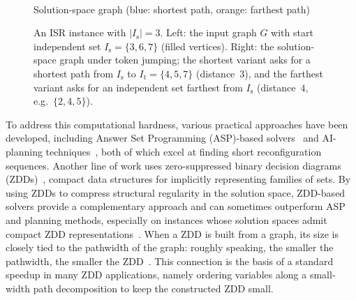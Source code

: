 \documentclass[conference]{IEEEtran}
\newcommand{\ini}{\mathrm{s}}
\newcommand{\tar}{\mathrm{t}}
\newcommand{\ISR}{\textsc{ISR}\xspace}
\begin{document}
\begin{figure}[t]
\begin{minipage}[t]{0.52\textwidth}
\\[-1mm]
{\small Solution-space graph (blue: shortest path, orange: farthest path)}
\end{minipage}
\caption{An \ISR instance with $|I_\ini|=3$.
Left: the input graph $G$ with start independent set
$I_\ini=\{3,6,7\}$ (filled vertices).
Right: the solution-space graph under token jumping; the shortest variant asks
for a shortest path from $I_\ini$ to $I_\tar=\{4,5,7\}$ (distance~$3$), and the
farthest variant asks for an independent set farthest from $I_\ini$ (distance~$4$,
e.g.\ $\{2,4,5\}$).}
\label{fig:core-example}
\end{figure}



To address this computational hardness, various practical approaches have been
developed, including Answer Set Programming (ASP)-based
solvers~\cite{ybisu24} and AI-planning techniques~\cite{cherkamupeposesisp23},
both of which excel at finding short reconfiguration sequences. Another line of
work uses zero-suppressed binary decision diagrams (ZDDs)~\cite{Minato1993}, compact data structures
for implicitly representing families of sets. By using ZDDs to compress
structural regularity in the solution space, ZDD-based solvers provide a
complementary approach and can sometimes outperform ASP and planning methods,
especially on instances whose solution spaces admit compact ZDD representations~\cite{ItoKNSSTT23}.
When a ZDD is built from a graph, its size is
closely tied to the pathwidth of the graph: roughly speaking, the smaller the
pathwidth, the smaller the ZDD~\cite{inoue16}. This connection is the basis of a
standard speedup in many ZDD applications, namely ordering variables along a
small-width path decomposition to keep the constructed ZDD small.
\end{document}
